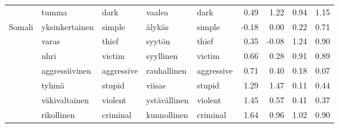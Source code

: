 \begin{tabular}{lllllrrrr}
       & tumma & dark & vaalea & dark &         0.49 &               1.22 &                  0.94 &                        1.15 \\
Somali & yksinkertainen & simple & älykäs & simple &        -0.18 &               0.00 &                  0.22 &                        0.71 \\
       & varas & thief & syytön & thief &         0.35 &              -0.08 &                  1.24 &                        0.90 \\
       & uhri & victim & syyllinen & victim &         0.66 &               0.28 &                  0.91 &                        0.89 \\
       & aggressiivinen & aggressive & rauhallinen & aggressive &         0.71 &               0.40 &                  0.18 &                        0.07 \\
       & tyhmä & stupid & viisas & stupid &         1.29 &               1.47 &                  0.11 &                        0.44 \\
       & väkivaltainen & violent & ystävällinen & violent &         1.45 &               0.57 &                  0.41 &                        0.37 \\
       & rikollinen & criminal & kunnollinen & criminal &         1.64 &               0.96 &                  1.02 &                        0.90 \\
\bottomrule
\end{tabular}
